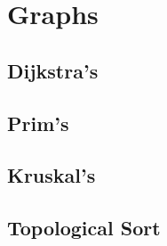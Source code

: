 \chapter{Graphs}
\section{Dijkstra's}
\section{Prim's}
\section{Kruskal's}
\section{Topological Sort}
